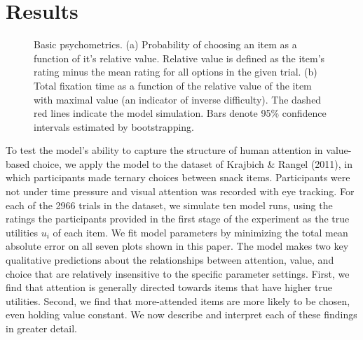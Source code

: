 \documentclass[12pt,a4paperpaper,]{article}
\begin{document}


\section{Results}

\begin{figure}[t!]
  \centering
  \caption{Basic psychometrics.
    (a) Probability of choosing an item as a function of it's relative value. Relative value is defined as the item's rating minus the mean rating for all options in the given trial.
    (b) Total fixation time as a function of the relative value of the item with maximal value (an indicator of inverse difficulty).
    The dashed red lines indicate the model simulation. Bars denote 95\% confidence intervals estimated by bootstrapping.
  }
  \label{fig:fixate_on_best}
\end{figure}

To test the model's ability to capture the structure of human attention in value-based choice, we apply the model to the dataset of Krajbich \& Rangel (2011), in which participants made ternary choices between snack items. Participants were not under time pressure and visual attention was recorded with eye tracking. For each of the 2966 trials in the dataset, we simulate ten model runs, using the ratings the participants provided in the first stage of the experiment as the true utilities $u_i$ of each item. We fit model parameters by minimizing the total mean absolute error on all seven plots shown in this paper. The model makes two key qualitative predictions about the relationships between attention, value, and choice that are relatively insensitive to the specific parameter settings. First, we find that attention is generally directed towards items that have higher true utilities. Second, we find that more-attended items are more likely to be chosen, even holding value constant. We now describe and interpret each of these findings in greater detail.
\end{document}
